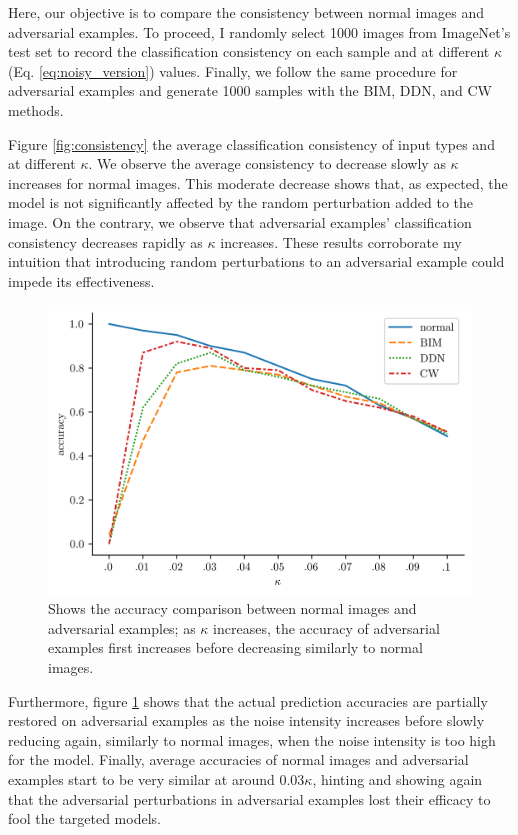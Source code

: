Here, our objective is to compare the consistency between normal images and
adversarial examples. To proceed, I randomly select 1000 images from ImageNet's
test set to record the classification consistency on each sample and at
different $\kappa$ (Eq. \eqref{eq:noisy_version}) values. Finally, we follow the
same procedure for adversarial examples and generate 1000 samples with the BIM,
DDN, and CW methods.

Figure \ref{fig:consistency} the average classification consistency of input
types and at different $\kappa$. We observe the average consistency to decrease
slowly as $\kappa$ increases for normal images. This moderate decrease shows
that, as expected, the model is not significantly affected by the random
perturbation added to the image. On the contrary, we observe that adversarial
examples' classification consistency decreases rapidly as $\kappa$ increases.
These results corroborate my intuition that introducing random perturbations to
an adversarial example could impede its effectiveness.

\begin{figure}[ht]
    \includegraphics[width=\columnwidth]{Figures/experiments/accuracy.png}%
    \caption{Shows the accuracy comparison between normal images and adversarial
        examples; as $\kappa$ increases, the accuracy of adversarial examples first
        increases before decreasing similarly to normal images.}
    \label{fig:accuracies}
\end{figure}

Furthermore, figure \ref{fig:accuracies} shows that the actual prediction
accuracies are partially restored on adversarial examples as the noise intensity
increases before slowly reducing again, similarly to normal images, when the
noise intensity is too high for the model. Finally, average accuracies of normal
images and adversarial examples start to be very similar at around $0.03
    \kappa$, hinting and showing again that the adversarial perturbations in
adversarial examples lost their efficacy to fool the targeted models.


